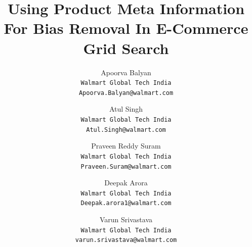 \documentclass[11pt]{article}
\begin{document}
\title{Using Product Meta Information For Bias Removal In E-Commerce Grid Search}

\author{
  Apoorva Balyan\\
  \texttt{Walmart Global Tech India} \\
  \texttt{Apoorva.Balyan@walmart.com}
  \and
  Atul Singh\\
  \texttt{Walmart Global Tech India} \\
  \texttt{Atul.Singh@walmart.com}
  \and
  Praveen Reddy Suram\\
  \texttt{Walmart Global Tech India} \\
  \texttt{Praveen.Suram@walmart.com}
  \and
  Deepak Arora\\
  \texttt{Walmart Global Tech India} \\
  \texttt{Deepak.arora1@walmart.com}
  \and
  Varun Srivastava\\
  \texttt{Walmart Global Tech India} \\
  \texttt{varun.srivastava@walmart.com}
}
\maketitle
\end{document}
